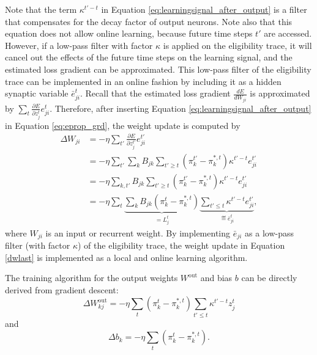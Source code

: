             Note that the term $\kappa^{t'-t}$ in Equation \ref{eq:learningsignal_after_output} is a filter that compensates for the decay factor of output neurons.
            Note also that this equation does not allow online learning, because future time steps $t'$ are accessed.
            However, if a low-pass filter with factor $\kappa$ is applied on the eligibility trace, it will cancel out the effects of the future time steps on the learning signal, and the estimated loss gradient can be approximated.
            This low-pass filter of the eligibility trace can be implemented in an online fashion by including it as a hidden synaptic variable $\bar{e}^t_{ji}$.
            Recall that the estimated loss gradient $\frac{dE}{dW_{ji}}$ is approximated by $\sum_t \frac{\partial E}{\partial z^t_j}e^t_{ji}$.
            Therefore, after inserting Equation \ref{eq:learningsignal_after_output} in Equation \ref{eq:eprop_grd}, the weight update is computed by
            \begin{align}
            \Delta W_{ji} &= -\eta\sum_{t'}\frac{\partial E}{\partial z^{t'}_j}e^{t'}_{ji}\\
            &= -\eta\sum_{t'}\sum_kB_{jk}\sum_{t'\geq t}\left(\pi^{t'}_k - \pi^{*,t}_k\right)\kappa^{t'-t}e^{t'}_{ji}\\
            &= -\eta\sum_{k, t'}B_{jk}\sum_{t'\geq t}\left(\pi^{t'}_k - \pi^{*,t}_k\right)\kappa^{t'-t}e^{t'}_{ji}\\
            &= -\eta\sum_t\underbrace{\sum_kB_{jk}\left(\pi^{t}_k - \pi^{*,t}_k\right)}_{=L^t_j}\underbrace{\sum_{t'\leq t}\kappa^{t'-t}e^{t'}_{ji}}_{\eqdef \bar{e}^t_{ji}}\label{dwlast},
            \end{align}
            where $W_{ji}$ is an input or recurrent weight.
            By implementing $\bar{e}_{ji}$ as a low-pass filter (with factor $\kappa$) of the eligibility trace, the weight update in Equation \ref{dwlast} is implemented as a local and online learning algorithm.

            The training algorithm for the output weights $W^\text{out}$ and bias $b$ can be directly derived from gradient descent:
            \begin{equation}
            \Delta W^\text{out}_{kj} = -\eta \sum_t\left(\pi^t_k - \pi^{*,t}_k\right)\sum_{t'\leq t}\kappa^{t'-t}z^t_j
            \end{equation}
            and
            \begin{equation}
            \Delta b_k = -\eta \sum_t\left(\pi^t_k - \pi^{*,t}_k\right).
            \end{equation}

